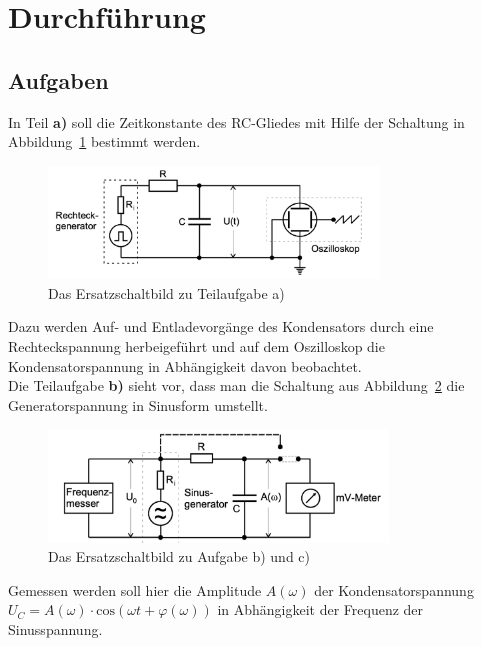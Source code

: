 \section{Durchführung}
\label{sec:Durchfuehrung}



\subsection{Aufgaben}
\label{subsec:Aufgaben}

In Teil \textbf{a)} soll die Zeitkonstante des RC-Gliedes mit Hilfe der Schaltung in
Abbildung~\ref{fig:esb1} bestimmt werden.

\begin{figure}
    
    \centering
    \includegraphics[height=3cm]{content/esb1.png}
    \caption{Das Ersatzschaltbild zu Teilaufgabe a)}
    \label{fig:esb1}
\end{figure}

Dazu werden Auf- und Entladevorgänge des Kondensators 
durch eine Rechteckspannung herbeigeführt und auf dem Oszilloskop die Kondensatorspannung in 
Abhängigkeit davon beobachtet. \\


Die Teilaufgabe \textbf{b)} sieht vor, dass man die Schaltung aus Abbildung~\ref{fig:esb2} die Generatorspannung in Sinusform umstellt.

\begin{figure}
    
    \centering
    \includegraphics[height=3cm]{content/esb2.png}
    \caption{Das Ersatzschaltbild zu Aufgabe b) und c)}
    \label{fig:esb2}
\end{figure}

Gemessen werden soll hier die Amplitude $A(\omega)$ der Kondensatorspannung
 $U_C = A(\omega) \cdot \textrm{cos}(\omega t + \varphi(\omega))$ in Abhängigkeit der Frequenz
der Sinusspannung.\\

